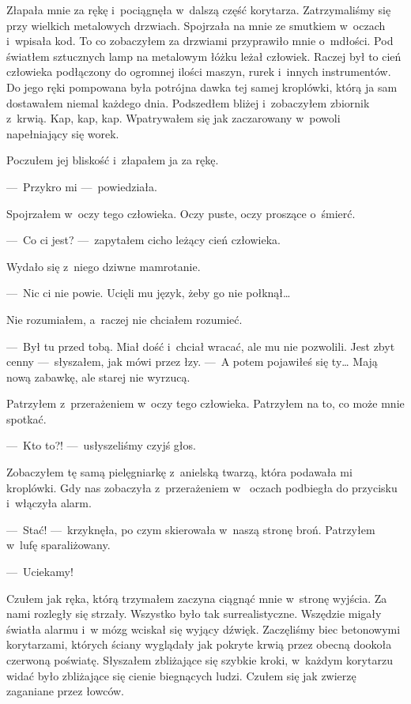 Złapała mnie za rękę i~pociągnęła w~dalszą część korytarza. Zatrzymaliśmy się przy wielkich metalowych drzwiach. 
Spojrzała na mnie ze smutkiem w~oczach i~wpisała kod. To co zobaczyłem za drzwiami przyprawiło mnie o~mdłości. Pod 
światłem sztucznych lamp na metalowym łóżku leżał człowiek. Raczej był to cień człowieka podłączony do ogromnej 
ilości maszyn, rurek i~innych instrumentów. Do jego ręki pompowana była potrójna dawka tej samej kroplówki, którą ja 
sam dostawałem niemal każdego dnia. Podszedłem bliżej i~zobaczyłem zbiornik z~krwią. Kap, kap, kap. Wpatrywałem się 
jak zaczarowany w~powoli napełniający się worek. 

Poczułem jej bliskość i~złapałem ja za rękę. 

---~Przykro mi ---~powiedziała.

Spojrzałem w~oczy tego człowieka. Oczy puste, oczy proszące o~śmierć. 

---~Co ci jest? ---~zapytałem cicho leżący cień człowieka.

Wydało się z~niego dziwne mamrotanie.

---~Nic ci nie powie. Ucięli mu język, żeby go nie połknął…

Nie rozumiałem, a~raczej nie chciałem rozumieć.

---~Był tu przed tobą. Miał dość i~chciał wracać, ale mu nie pozwolili. Jest zbyt cenny ---~słyszałem, jak mówi przez 
łzy. ---~A potem pojawiłeś się ty… Mają nową zabawkę, ale starej nie wyrzucą.

Patrzyłem z~przerażeniem w~oczy tego człowieka. Patrzyłem na to, co może mnie spotkać. 

---~Kto to?! ---~usłyszeliśmy czyjś głos.

Zobaczyłem tę samą pielęgniarkę z~anielską twarzą, która podawała mi kroplówki. Gdy nas zobaczyła z~przerażeniem w~
oczach podbiegła do przycisku i~włączyła alarm.

---~Stać! ---~krzyknęła, po czym skierowała w~naszą stronę broń. Patrzyłem w~lufę sparaliżowany.

---~Uciekamy!

Czułem jak ręka, którą trzymałem zaczyna ciągnąć mnie w~stronę wyjścia. Za nami rozległy się strzały. Wszystko było 
tak surrealistyczne. Wszędzie migały światła alarmu i~w mózg wciskał się wyjący dźwięk. Zaczęliśmy biec betonowymi 
korytarzami, których ściany wyglądały jak pokryte krwią przez obecną dookoła czerwoną poświatę. Słyszałem zbliżające 
się szybkie kroki, w~każdym korytarzu widać było zbliżające się cienie biegnących ludzi.  Czułem się jak zwierzę 
zaganiane przez łowców. 

